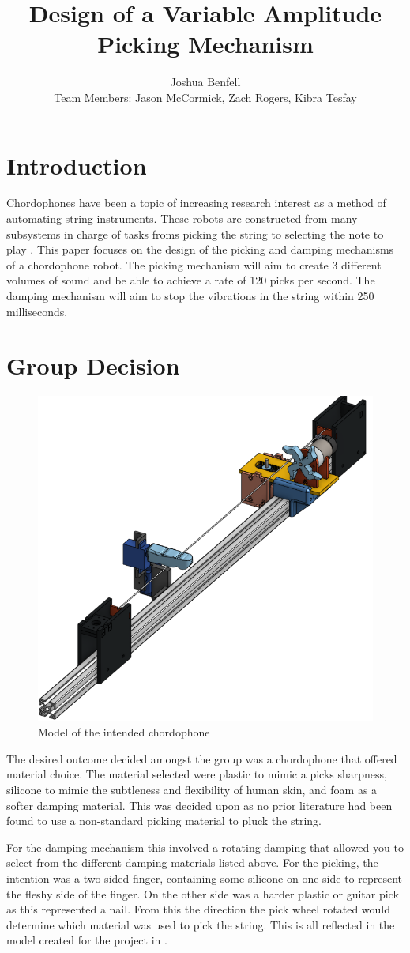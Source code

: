 \documentclass[12pt, a4paper, onecolumn]{IEEEtran}
\title{Design of a Variable Amplitude Picking Mechanism}
\author{Joshua Benfell\\Team Members: Jason McCormick, Zach Rogers, Kibra Tesfay}
\begin{document}
	\maketitle
    \section{Introduction}
		Chordophones have been a topic of increasing research interest as a method of automating string instruments.
		These robots are constructed from many subsystems in charge of tasks froms picking the string to selecting the note to play \cite{VUW_Chordophones}.
		This paper focuses on the design of the picking and damping mechanisms of a chordophone robot.
		The picking mechanism will aim to create 3 different volumes of sound and be able to achieve a rate of 120 picks per second.
		The damping mechanism will aim to stop the vibrations in the string within 250 milliseconds.


	\section{Group Decision}
		\begin{figure}[!h]
			\centering
			\includegraphics[width=0.5\columnwidth]{chordophoneModel.png}
			\caption{Model of the intended chordophone}
			\label{fig:model}
		\end{figure}
		The desired outcome decided amongst the group was a chordophone that offered material choice.
		The material selected were plastic to mimic a picks sharpness, silicone to mimic the subtleness and flexibility of human skin, and foam as a softer damping material.
		This was decided upon as no prior literature had been found to use a non-standard picking material to pluck the string.

		For the damping mechanism this involved a rotating damping that allowed you to select from the different damping materials listed above.
		For the picking, the intention was a two sided finger, containing some silicone on one side to represent the fleshy side of the finger.
		On the other side was a harder plastic or guitar pick as this represented a nail.
		From this the direction the pick wheel rotated would determine which material was used to pick the string.
		This is all reflected in the model created for the project in .
		
\end{document}
